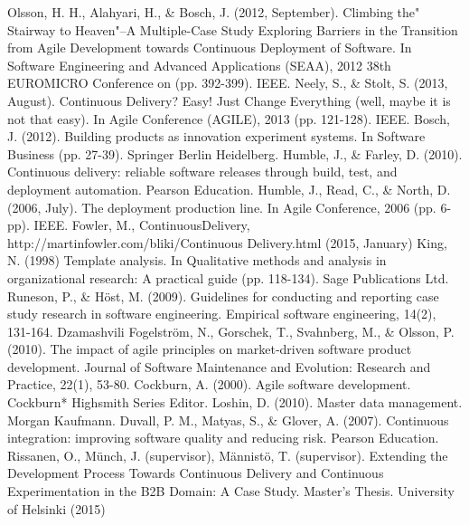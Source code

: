 \documentclass[lnbip]{svmultln}
\begin{document}
%
%
\begin{thebibliography}{5}

 Olsson, H. H., Alahyari, H., \& Bosch, J. (2012, September). Climbing the" Stairway to Heaven"--A Multiple-Case Study Exploring Barriers in the Transition from Agile Development towards Continuous Deployment of Software. In Software Engineering and Advanced Applications (SEAA), 2012 38th EUROMICRO Conference on (pp. 392-399). IEEE.
 Neely, S., \& Stolt, S. (2013, August). Continuous Delivery? Easy! Just Change Everything (well, maybe it is not that easy). In Agile Conference (AGILE), 2013 (pp. 121-128). IEEE. 
 Bosch, J. (2012). Building products as innovation experiment systems. In Software Business (pp. 27-39). Springer Berlin Heidelberg.
 Humble, J., \& Farley, D. (2010). Continuous delivery: reliable software releases through build, test, and deployment automation. Pearson Education.
 Humble, J., Read, C., \& North, D. (2006, July). The deployment production line. In Agile Conference, 2006 (pp. 6-pp). IEEE.
 Fowler, M., ContinuousDelivery, http://martinfowler.com/bliki/Continuous \newline Delivery.html (2015, January)
 King, N. (1998) Template analysis. In Qualitative methods and analysis in organizational research: A practical guide (pp. 118-134). Sage Publications Ltd.
 Runeson, P., \& Höst, M. (2009). Guidelines for conducting and reporting case study research in software engineering. Empirical software engineering, 14(2), 131-164.
 Dzamashvili Fogelström, N., Gorschek, T., Svahnberg, M., \& Olsson, P. (2010). The impact of agile principles on market‐driven software product development. Journal of Software Maintenance and Evolution: Research and Practice, 22(1), 53-80.
 Cockburn, A. (2000). Agile software development. Cockburn* Highsmith Series Editor.
 Loshin, D. (2010). Master data management. Morgan Kaufmann.
 Duvall, P. M., Matyas, S., \& Glover, A. (2007). Continuous integration: improving software quality and reducing risk. Pearson Education.
 Rissanen, O., M{\"u}nch, J. (supervisor), M{\"a}nnist{\"o}, T. (supervisor). Extending the Development Process Towards Continuous Delivery and Continuous Experimentation in the B2B Domain: A Case Study. Master's Thesis. University of Helsinki (2015)

\end{thebibliography}
%
\end{document}
